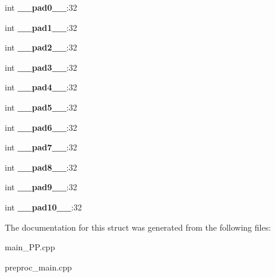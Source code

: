 \begin{DoxyCompactItemize}
\item 
\hypertarget{structtimex_a90962ad4896202cd8eb712eca48fdb12}{int {\bfseries \+\_\+\+\_\+pad0\+\_\+\+\_\+}\+:32}\label{structtimex_a90962ad4896202cd8eb712eca48fdb12}

\item 
\hypertarget{structtimex_abf0f54d79114b234ed4e92f17577c8e3}{int {\bfseries \+\_\+\+\_\+pad1\+\_\+\+\_\+}\+:32}\label{structtimex_abf0f54d79114b234ed4e92f17577c8e3}

\item 
\hypertarget{structtimex_a929889bff57884a3f405a639c7d6a2fe}{int {\bfseries \+\_\+\+\_\+pad2\+\_\+\+\_\+}\+:32}\label{structtimex_a929889bff57884a3f405a639c7d6a2fe}

\item 
\hypertarget{structtimex_ac8f9d98e0568557531df796dc7f5edc4}{int {\bfseries \+\_\+\+\_\+pad3\+\_\+\+\_\+}\+:32}\label{structtimex_ac8f9d98e0568557531df796dc7f5edc4}

\item 
\hypertarget{structtimex_a671137e56d12dfed32b065c5581c8b09}{int {\bfseries \+\_\+\+\_\+pad4\+\_\+\+\_\+}\+:32}\label{structtimex_a671137e56d12dfed32b065c5581c8b09}

\item 
\hypertarget{structtimex_af00a2f5a40856781f53ccf9eed27eb79}{int {\bfseries \+\_\+\+\_\+pad5\+\_\+\+\_\+}\+:32}\label{structtimex_af00a2f5a40856781f53ccf9eed27eb79}

\item 
\hypertarget{structtimex_ae5775230c1d76ec4aaa42fe1d7e6e1df}{int {\bfseries \+\_\+\+\_\+pad6\+\_\+\+\_\+}\+:32}\label{structtimex_ae5775230c1d76ec4aaa42fe1d7e6e1df}

\item 
\hypertarget{structtimex_a14deffe1302d644deb2ffa5eae371e27}{int {\bfseries \+\_\+\+\_\+pad7\+\_\+\+\_\+}\+:32}\label{structtimex_a14deffe1302d644deb2ffa5eae371e27}

\item 
\hypertarget{structtimex_a56235b592c92841d640f0f7acc6be64e}{int {\bfseries \+\_\+\+\_\+pad8\+\_\+\+\_\+}\+:32}\label{structtimex_a56235b592c92841d640f0f7acc6be64e}

\item 
\hypertarget{structtimex_adf621ae90369245c821aab0256985e0a}{int {\bfseries \+\_\+\+\_\+pad9\+\_\+\+\_\+}\+:32}\label{structtimex_adf621ae90369245c821aab0256985e0a}

\item 
\hypertarget{structtimex_a785e7395145f22afcce4defd4d9dad85}{int {\bfseries \+\_\+\+\_\+pad10\+\_\+\+\_\+}\+:32}\label{structtimex_a785e7395145f22afcce4defd4d9dad85}

\end{DoxyCompactItemize}


The documentation for this struct was generated from the following files\+:\begin{DoxyCompactItemize}
\item 
main\+\_\+\+P\+P.\+cpp\item 
preproc\+\_\+main.\+cpp\end{DoxyCompactItemize}
